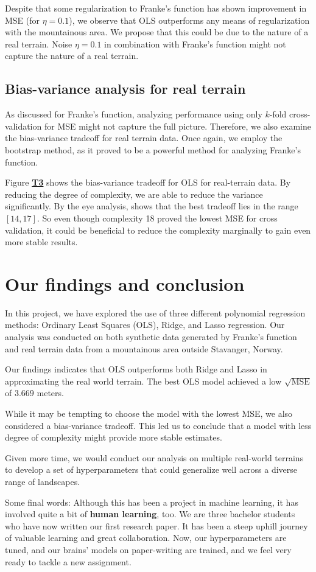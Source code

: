 \documentclass{article}
\begin{document}
\begin{multicols}{2}
Despite that some regularization to Franke's function has shown improvement in MSE (for $\eta = 0.1$), we observe that OLS outperforms any means of regularization with the mountainous area. We propose that this could be due to the nature of a real terrain. Noise $\eta = 0.1$ in combination with Franke's function might not capture the nature of a real terrain. 

\subsection*{Bias-variance analysis for real terrain}
As discussed for Franke's function, analyzing performance using only $k$-fold cross-validation for MSE might not capture the full picture. Therefore, we also examine the bias-variance tradeoff for real terrain data. Once again, we employ the bootstrap method, as it proved to be a powerful method for analyzing Franke's function.

Figure \hyperref[fig:T3]{\textbf{T3}} shows the bias-variance tradeoff for OLS for real-terrain data.
By reducing the degree of complexity, we are able to reduce the variance significantly. By the eye analysis, shows that the best tradeoff lies in the range $[14, 17]$. So even though complexity 18 proved the lowest MSE for cross validation, it could be beneficial to reduce the complexity marginally to gain even more stable results. 

\section*{Our findings and conclusion}
In this project, we have explored the use of three different polynomial regression methods: Ordinary Least Squares (OLS), Ridge, and Lasso regression. Our analysis was conducted on both synthetic data generated by Franke’s function and real terrain data from a mountainous area outside Stavanger, Norway.

Our findings indicates that OLS outperforms both Ridge and Lasso in approximating the real world terrain. The best OLS model achieved a low $\sqrt{\text{MSE}}$ of $3.669$ meters.

While it may be tempting to choose the model with the lowest MSE, we also considered a bias-variance tradeoff. This led us to conclude that a model with less degree of complexity might provide more stable estimates. 

Given more time, we would conduct our analysis on multiple real-world terrains to develop a set of hyperparameters that could generalize well across a diverse range of landscapes.

Some final words: Although this has been a project in machine learning, it has involved quite a bit of \textbf{human learning}, too. We are three bachelor students who have now written our first research paper. It has been a steep uphill journey of valuable learning and great collaboration. Now, our hyperparameters are tuned, and our brains’ models on paper-writing are trained, and we feel very ready to tackle a new assignment.
\end{multicols}
\end{document}
